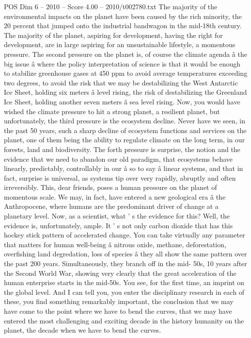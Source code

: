 \begin{textsample}{POS Dim 6 – 2010 – Score 4.00 – 2010/t002780.txt}
The majority of the environmental impacts on the planet have been caused by the rich minority, the 20 percent that jumped onto the industrial bandwagon in the mid-18th century.
The majority of the planet, aspiring for development, having the right for development, are in large aspiring for an unsustainable lifestyle, a momentous pressure.
The second pressure on the planet is, of course the climate agenda â the big issue â where the policy interpretation of science is that it would be enough to stabilize greenhouse gases at 450 ppm to avoid average temperatures exceeding two degrees, to avoid the risk that we may be destabilizing the West Antarctic Ice Sheet, holding six meters â level rising, the risk of destabilizing the Greenland Ice Sheet, holding another seven meters â sea level rising.
Now, you would have wished the climate pressure to hit a strong planet, a resilient planet, but unfortunately, the third pressure is the ecosystem decline.
Never have we seen, in the past 50 years, such a sharp decline of ecosystem functions and services on the planet, one of them being the ability to regulate climate on the long term, in our forests, land and biodiversity.
The forth pressure is surprise, the notion and the evidence that we need to abandon our old paradigm, that ecosystems behave linearly, predictably, controllably in our â so to say â linear systems, and that in fact, surprise is universal, as systems tip over very rapidly, abruptly and often irreversibly.
This, dear friends, poses a human pressure on the planet of momentous scale.
We may, in fact, have entered a new geological era â the Anthropocene, where humans are the predominant driver of change at a planetary level.
Now, as a scientist, what ' s the evidence for this?
Well, the evidence is, unfortunately, ample.
It ' s not only carbon dioxide that has this hockey stick pattern of accelerated change.
You can take virtually any parameter that matters for human well-being â nitrous oxide, methane, deforestation, overfishing land degredation, loss of species â they all show the same pattern over the past 200 years.
Simultaneously, they branch off in the mid- 50s, 10 years after the Second World War, showing very clearly that the great acceleration of the human enterprise starts in the mid-50s.
You see, for the first time, an imprint on the global level.
And I can tell you, you enter the disciplinary research in each of these, you find something remarkably important, the conclusion that we may have come to the point where we have to bend the curves, that we may have entered the most challenging and exciting decade in the history humanity on the planet, the decade when we have to bend the curves.

\end{textsample}
